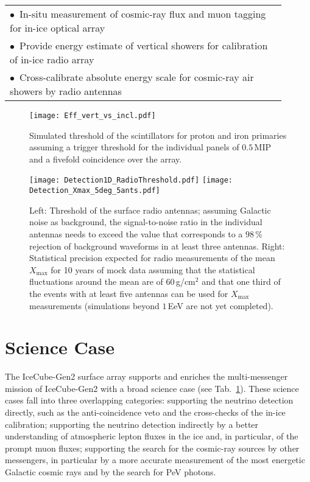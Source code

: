 \documentclass[a4paper,11pt]{article}
\begin{document}
\begin{table}[p]
\begin{tabular}{p{0.9\linewidth}}
        \hline
        \vspace{-0.2cm} $\bullet$\,\,\,In-situ measurement of cosmic-ray flux and muon tagging for in-ice optical array\\
        \vspace{-0.2cm} $\bullet$\,\,\,Provide energy estimate of vertical showers for calibration of in-ice radio array\\
        \vspace{-0.2cm} $\bullet$\,\,\,Cross-calibrate absolute energy scale for cosmic-ray air showers by radio antennas\\
        
    \end{tabular}
    \vspace{-0.1cm}
    \label{tab:sciencecase}
\end{table}


\begin{figure}[p]
    \centering
    \texttt{[image: Eff\_vert\_vs\_incl.pdf]}
    \caption{Simulated threshold of the scintillators for proton and iron primaries assuming a trigger threshold for the individual panels of $0.5\,$MIP and a fivefold coincidence over the array.
    }
    \label{fig:scintThreshold}
\end{figure}


\begin{figure}[t]
    \centering
    \texttt{[image: Detection1D\_RadioThreshold.pdf]}
    \hfill  
    \texttt{[image: Detection\_Xmax\_5deg\_5ants.pdf]}
    \caption{Left: Threshold of the surface radio antennas; assuming Galactic noise as background, the signal-to-noise ratio in the individual antennas needs to exceed the value that corresponds to a $98\,\%$ rejection of background waveforms in at least three antennas.
    Right: Statistical precision expected for radio measurements of the mean $X_\mathrm{max}$ for 10 years of mock data assuming that the statistical fluctuations around the mean are of $60\,$g/cm$^2$ and that  one third of the events with at least five antennas can be used for $X_\mathrm{max}$ measurements (simulations beyond $1\,$EeV are not yet completed).
    }
    \label{fig:radioThreshold}
\end{figure}


\section{Science Case}
The IceCube-Gen2 surface array supports and enriches the multi-messenger mission of IceCube-Gen2 with a broad science case (see Tab.~\ref{tab:sciencecase}). 
These science cases fall into three overlapping categories: supporting the neutrino detection directly, such as the anti-coincidence veto and the cross-checks of the in-ice calibration; supporting the neutrino detection indirectly by a better understanding of atmospheric lepton fluxes in the ice and, in particular, of the prompt muon fluxes; supporting the search for the cosmic-ray sources by other messengers, in particular by a more accurate measurement of the most energetic Galactic cosmic rays and by the search for PeV photons. 
\end{document}
